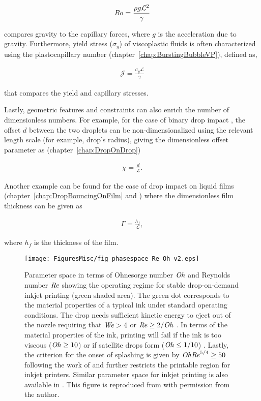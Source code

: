 \begin{align}\label{Ch0::Bo}
	\mathit{Bo} = \frac{\rho g\mathcal{L}^2}{\gamma}
\end{align}

\noindent compares gravity to the capillary forces, where $g$ is the acceleration due to gravity. Furthermore, yield stress ($\sigma_y$) of viscoplastic fluids is often characterized using the plastocapillary number (chapter~\ref{chap:BurstingBubbleVP}), defined as, 

\begin{align}\label{Ch0::J}
	\mathcal{J} = \frac{\sigma_y\mathcal{L}}{\gamma}
\end{align}

\noindent that compares the yield and capillary stresses. 

Lastly, geometric features and constraints can also enrich the number of dimensionless numbers. For example, for the case of binary drop impact \citep{jiang1992, qian1997}, the offset $d$ between the two droplets can be non-dimensionalized using the relevant length scale (for example, drop's radius), giving the dimensionless offset parameter as (chapter~\ref{chap:DropOnDrop})

\begin{align}\label{Ch0::X}
		\chi = \frac{d}{\mathcal{L}}.
\end{align}

Another example can be found for the case of drop impact on liquid films (chapter~\ref{chap:DropBouncingOnFilm} and \citet{tang2019bouncing}) where the dimensionless film thickness can be given as

\begin{align}\label{Ch0::Gamma}
		\Gamma = \frac{h_f}{\mathcal{L}},
\end{align}

\noindent where $h_f$ is the thickness of the film.

\begin{figure}
	\centering
	\texttt{[image: FiguresMisc/fig\_phasespace\_Re\_Oh\_v2.eps]}
	\caption{Parameter space in terms of Ohnesorge number $\mathit{Oh}$ and Reynolds number $\mathit{Re}$ showing the operating regime for stable drop-on-demand inkjet printing (green shaded area). The green dot corresponds to the material properties of a typical ink under standard operating conditions. The drop needs sufficient kinetic energy to eject out of the nozzle requiring that $\mathit{We} > 4$ or $\mathit{Re} \ge 2/\mathit{Oh}$ \citep{reitz1998drop}. In terms of the material properties of the ink, printing will fail if the ink is too viscous ($\mathit{Oh} \ge 10$) or if satellite drops form ($\mathit{Oh} \le 1/10$) \citep{notz2004dynamics, dong2006experimental, xu2007nonsolvent}. Lastly, the criterion for the onset of splashing is given by $\mathit{Oh}\mathit{Re}^{5/4} \ge 50$ following the work of \citet[][also see chapter~\ref{chap:DropForces}]{derby2010inkjet} and further restricts the printable region for inkjet printers. Similar parameter space for inkjet printing is also available in \citet{von1937anwendung, derby2010inkjet, mckinley2011wolfgang, lohse2022fundamental}. This figure is reproduced from \citet{lohse2022fundamental} with permission from the author.}
	\label{Ch0::Fig4}
\end{figure}

